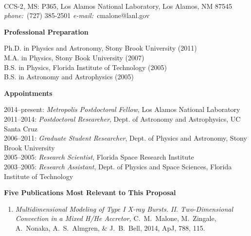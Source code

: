 \documentclass[11pt,letterpaper,english]{article}
\begin{document}
\setlength{\parindent}{0in} %

\pagestyle{fancy}   \renewcommand{%
\headrulewidth}{0.0pt}



\\
{ CCS-2, MS: P365, Los Alamos National Laboratory, Los Alamos, NM 87545} \\
{\it phone:}~(727) 385-2501 \hskip 2mm
{\it e-mail:}~cmalone@lanl.gov \hskip 2mm 

\begin{flushleft} {\bf Professional Preparation}
{\parindent 16pt

Ph.D. in Physics and Astronomy, Stony Brook University (2011)\\ 
M.A. in Physics, Stony Book University (2007)\\ 
B.S. in Physics, Florida Institute of Technology (2005)\\ 
B.S. in Astronomy and Astrophysics (2005)\\
}

\vspace{.04in}
{\bf Appointments}
{\parindent 16pt

2014--present: {\em Metropolis Postdoctoral Fellow}, Los Alamos National Laboratory \\ 
2011--2014: {\em Postdoctoral Researcher}, Dept. of Astronomy and Astrophysics, UC Santa Cruz\\ 
2006--2011: {\em Graduate Student Researcher}, Dept. of Physics and Astronomy, Stony Brook University  \\ 
2005--2005: {\em Research Scientist}, Florida Space Research Institute \\
2003--2005: {\em Research Assistant}, Dept. of Physics and Space Sciences, Florida Institute of Technology
}

\vspace{.04in}
{\bf Five Publications Most Relevant to This Proposal}
\vspace{-6pt}
\begin{enumerate} \itemsep1pt \parskip0pt 
\item {\it Multidimensional Modeling of Type I X-ray
  Bursts. II. Two-Dimensional Convection in a Mixed H/He Accretor, }
  C.~M.~Malone, M.~Zingale, A.~Nonaka, A.~S.~Almgren, \& J.~B.~Bell,
  2014, ApJ, 788, 115.


\end{enumerate}
\end{flushleft}
\end{document}
